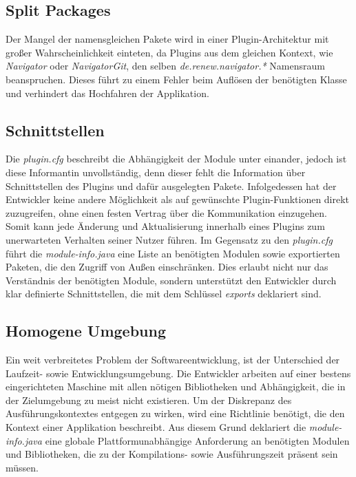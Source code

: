 	\subsection{Split Packages}
		Der Mangel der namensgleichen Pakete wird in einer Plugin-Architektur mit großer Wahrscheinlichkeit einteten, da Plugins aus dem gleichen Kontext, wie \textit{Navigator} oder \textit{NavigatorGit}, den selben \textit{de.renew.navigator.*} Namensraum beanspruchen. Dieses führt zu einem Fehler beim Auflösen der benötigten Klasse und verhindert das Hochfahren der Applikation. 

	\subsection{Schnittstellen}
		Die \textit{plugin.cfg} beschreibt die Abhängigkeit der Module unter einander, jedoch ist diese Informantin unvollständig, denn dieser fehlt die Information über Schnittstellen des Plugins und dafür ausgelegten Pakete. Infolgedessen hat der Entwickler keine andere Möglichkeit als auf gewünschte Plugin-Funktionen direkt zuzugreifen, ohne einen festen Vertrag über die Kommunikation einzugehen. Somit kann jede Änderung und Aktualisierung innerhalb eines Plugins zum unerwarteten Verhalten seiner Nutzer führen. \newline
		Im Gegensatz zu den \textit{plugin.cfg} führt die \textit{module-info.java} eine Liste an benötigten Modulen sowie exportierten Paketen, die den Zugriff von Außen einschränken. Dies erlaubt nicht nur das Verständnis der benötigten Module, sondern unterstützt den Entwickler durch klar definierte Schnittstellen, die mit dem Schlüssel \textit{exports} deklariert sind.

	\subsection{Homogene Umgebung}
		Ein weit verbreitetes Problem der Softwareentwicklung, ist der Unterschied der Laufzeit- sowie Entwicklungsumgebung. Die Entwickler arbeiten auf einer bestens eingerichteten Maschine mit allen nötigen Bibliotheken und Abhängigkeit, die in der Zielumgebung zu meist nicht existieren. Um der Diskrepanz des Ausführungskontextes entgegen zu wirken, wird eine Richtlinie benötigt, die den Kontext einer Applikation beschreibt. Aus diesem Grund deklariert die \textit{module-info.java} eine globale Plattformunabhängige Anforderung an benötigten Modulen und Bibliotheken, die zu der Kompilations- sowie Ausführungszeit präsent sein müssen.\bigbreak

